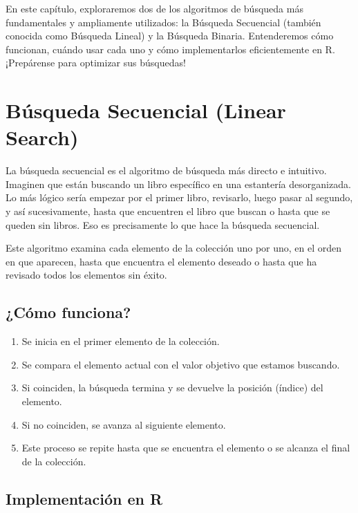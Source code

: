 \documentclass[
  spanish,
  letterpaper,
  DIV=11,
  numbers=noendperiod]{scrreprt}
\providecommand{\tightlist}{%
  \setlength{\itemsep}{0pt}\setlength{\parskip}{0pt}}
\begin{document}
En este capítulo, exploraremos dos de los algoritmos de búsqueda más
fundamentales y ampliamente utilizados: la Búsqueda Secuencial (también
conocida como Búsqueda Lineal) y la Búsqueda Binaria. Entenderemos cómo
funcionan, cuándo usar cada uno y cómo implementarlos eficientemente en
R. ¡Prepárense para optimizar sus búsquedas!

\section{Búsqueda Secuencial (Linear
Search)}\label{buxfasqueda-secuencial-linear-search}

La búsqueda secuencial es el algoritmo de búsqueda más directo e
intuitivo. Imaginen que están buscando un libro específico en una
estantería desorganizada. Lo más lógico sería empezar por el primer
libro, revisarlo, luego pasar al segundo, y así sucesivamente, hasta que
encuentren el libro que buscan o hasta que se queden sin libros. Eso es
precisamente lo que hace la búsqueda secuencial.

Este algoritmo examina cada elemento de la colección uno por uno, en el
orden en que aparecen, hasta que encuentra el elemento deseado o hasta
que ha revisado todos los elementos sin éxito.

\subsection{¿Cómo funciona?}\label{cuxf3mo-funciona}

\begin{enumerate}
\def\labelenumi{\arabic{enumi}.}
\tightlist
\item
  Se inicia en el primer elemento de la colección.
\item
  Se compara el elemento actual con el valor objetivo que estamos
  buscando.
\item
  Si coinciden, la búsqueda termina y se devuelve la posición (índice)
  del elemento.
\item
  Si no coinciden, se avanza al siguiente elemento.
\item
  Este proceso se repite hasta que se encuentra el elemento o se alcanza
  el final de la colección.
\end{enumerate}

\subsection{Implementación en R}\label{implementaciuxf3n-en-r}
\end{document}
